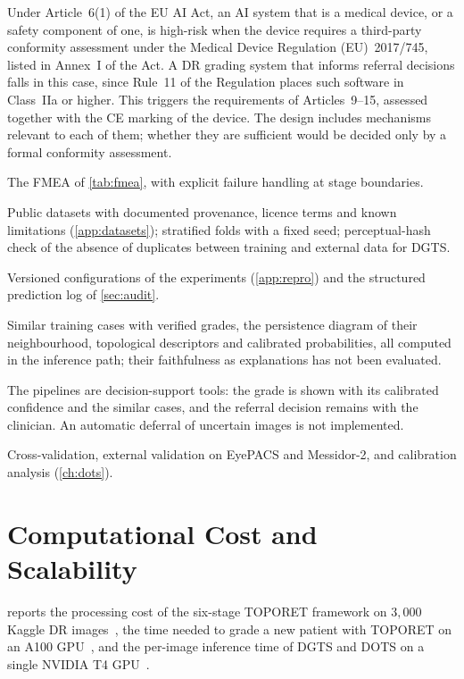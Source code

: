 Under Article~6(1) of the EU AI Act, an AI system that is a medical device, or a safety
component of one, is high-risk when the device requires a third-party conformity assessment
under the Medical Device Regulation (EU)~2017/745, listed in Annex~I of the Act. A DR grading
system that informs referral decisions falls in this case, since Rule~11 of the Regulation
places such software in Class~IIa or higher. This
triggers the requirements of Articles~9--15, assessed together with the CE marking of the
device. The design includes mechanisms relevant to each of them; whether they are
sufficient would be decided only by a formal conformity assessment.
\begin{description}[style=nextline,leftmargin=1.2em]
\item[Art.~9 (risk management)] The FMEA of \cref{tab:fmea}, with explicit failure
handling at stage boundaries.
\item[Art.~10 (data governance)] Public datasets with documented provenance, licence
terms and known limitations (\cref{app:datasets}); stratified folds with a fixed seed;
perceptual-hash check of the absence of duplicates between training and external data for
DGTS.
\item[Art.~11--12 (technical documentation, logging)] Versioned configurations of the
experiments (\cref{app:repro}) and the structured prediction log of \cref{sec:audit}.
\item[Art.~13 (transparency)] Similar training cases with verified grades, the
persistence diagram of their neighbourhood, topological descriptors and calibrated
probabilities, all computed in the inference path; their faithfulness as explanations has
not been evaluated.
\item[Art.~14 (human oversight)] The pipelines are decision-support tools: the grade is
shown with its calibrated confidence and the similar cases, and the referral decision
remains with the clinician. An automatic deferral of uncertain images is not implemented.
\item[Art.~15 (accuracy, robustness)] Cross-validation, external validation on EyePACS
and Messidor-2, and calibration analysis (\cref{ch:dots}).
\end{description}

\section{Computational Cost and Scalability}
\label{sec:latency}

 reports the processing cost of the six-stage TOPORET framework on
$3{,}000$ Kaggle DR images~\cite{belhadj2026enase}, the time needed to grade a new patient
with TOPORET on an A100 GPU~\cite{belhadj2025plos}, and the per-image inference time of DGTS
and DOTS on a single NVIDIA T4 GPU~\cite{belhadj2026dgts,belhadj2026dots}.

